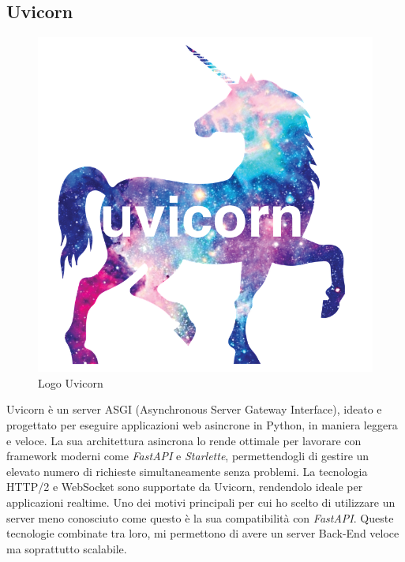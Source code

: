 \subsection{Uvicorn}
\begin{figure}
    \centering
    \vspace{-10px}
    \includegraphics[scale=0.15]{img/uvicorn.png}
    \caption{Logo Uvicorn}
\end{figure}

Uvicorn è un server ASGI (Asynchronous Server Gateway Interface), ideato e progettato per eseguire applicazioni web asincrone in Python, in maniera leggera e veloce. La sua architettura asincrona lo rende ottimale per lavorare con framework moderni come \textit{FastAPI} e \textit{Starlette}, permettendogli di gestire un elevato numero di richieste simultaneamente senza problemi. La tecnologia HTTP/2 e WebSocket sono supportate da Uvicorn, rendendolo ideale per applicazioni realtime. Uno dei motivi principali per cui ho scelto di utilizzare un server meno conosciuto come questo è la sua compatibilità con \textit{FastAPI}. Queste tecnologie combinate tra loro, mi permettono di avere un server Back-End veloce ma soprattutto scalabile. 


